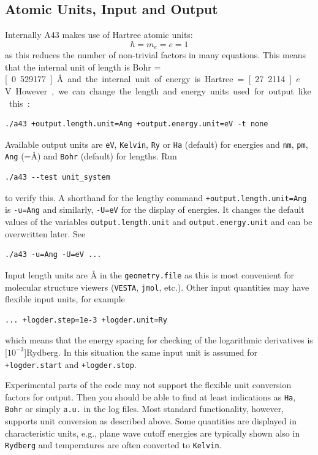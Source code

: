 \documentclass[oribibl]{llncs}
\newcommand{\ttt}[1]{\texttt{#1}}
\newcommand{\codename}{A43}
\begin{document}
\subsection{Atomic Units, Input and Output} \label{sec:units}
%
Internally \codename{} makes use of Hartree atomic units:
\begin{equation}
	\hbar = m_e = e = 1
\end{equation}
as this reduces the number of non-trivial factors in many equations.
This means that the internal unit of length is Bohr = \unit[0.529177]{\AA{}}
and the internal unit of energy is Hartree = \unit[27.2114]{$e$V}.
However, we can change the length and energy units used for output like this:
\begin{verbatim}
./a43 +output.length.unit=Ang +output.energy.unit=eV -t none
\end{verbatim}
Available output units are \ttt{eV}, \ttt{Kelvin}, \ttt{Ry} or \ttt{Ha} (default) for energies 
and \ttt{nm}, \ttt{pm}, \ttt{Ang} (=\AA) and \ttt{Bohr} (default) for lengths. Run
\begin{verbatim}
./a43 --test unit_system
\end{verbatim}
to verify this.
A shorthand for the lengthy command \ttt{+output.length.unit=Ang} is \ttt{-u=Ang} and similarly,
\ttt{-U=eV} for the display of energies. It changes the default values of the variables \ttt{output.length.unit} and \ttt{output.energy.unit} and can be overwritten later. See
\begin{verbatim}
./a43 -u=Ang -U=eV ...
\end{verbatim}
%
Input length units are \AA{} in the \ttt{geometry.file} as this is most convenient for molecular structure viewers
(\ttt{VESTA}, \ttt{jmol}, etc.). Other input quantities may have flexible input units, for example
\begin{verbatim}
... +logder.step=1e-3 +logder.unit=Ry
\end{verbatim}
which means that the energy spacing for checking of the logarithmic derivatives is \unit[$10^{-3}$]{Rydberg}.
In this situation the same input unit is assumed for \ttt{+logder.start} and \ttt{+logder.stop}.

\noindent
Experimental parts of the code may not support the flexible unit conversion
factors for output. Then you should be able to find at least indications as \ttt{Ha}, \ttt{Bohr} or simply \ttt{a.u.} in the log files.
Most standard functionality, however, supports unit conversion as described above.
Some quantities are displayed in characteristic units, e.g., plane wave cutoff energies are typically shown also in \ttt{Rydberg} and temperatures are often converted to \ttt{Kelvin}.
\end{document}
